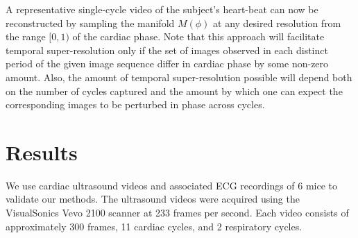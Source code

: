 \documentclass[runningheads,a4paper]{llncs}
\begin{document}
	A representative single-cycle video of the subject's heart-beat can now be reconstructed by sampling the manifold $M(\phi)$ at any desired resolution from the range $[0, 1)$ of the cardiac phase. Note that this approach will facilitate temporal super-resolution only if the set of images observed in each distinct period of the given image sequence differ in cardiac phase by some non-zero amount. Also, the amount of temporal super-resolution possible will depend both on the number of cycles captured and the amount by which one can expect the corresponding images to be perturbed in phase across cycles. 
\vspace{-0.3cm}
\section{Results}
\label{sec:results}
%
We use cardiac ultrasound videos and associated ECG recordings of 6 mice to validate our methods. The ultrasound videos were acquired using the VisualSonics Vevo 2100 scanner at 233 frames per second. Each video consists of approximately 300 frames, 11 cardiac cycles, and 2 respiratory cycles.
\end{document}
